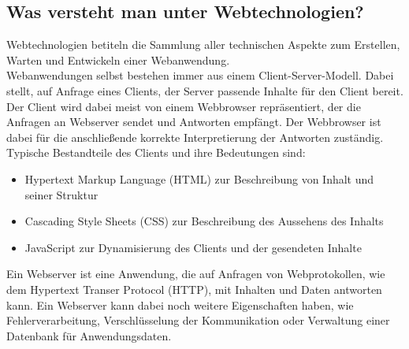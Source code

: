 \subsection{Was versteht man unter Webtechnologien?}
Webtechnologien betiteln die Sammlung aller technischen Aspekte zum Erstellen, Warten und Entwickeln einer Webanwendung.\\
Webanwendungen selbst bestehen immer aus einem Client-Server-Modell. Dabei stellt, auf Anfrage eines Clients, der Server passende Inhalte für den Client bereit. Der Client wird dabei meist von einem Webbrowser repräsentiert, der die Anfragen an Webserver sendet und Antworten empfängt. Der Webbrowser ist dabei für die anschließende korrekte Interpretierung der Antworten zuständig.
Typische Bestandteile des Clients und ihre Bedeutungen sind: 
\begin{itemize}
	\item Hypertext Markup Language (HTML) zur Beschreibung von Inhalt und seiner Struktur
	\item Cascading Style Sheets (CSS) zur Beschreibung des Aussehens des Inhalts
	\item JavaScript zur Dynamisierung des Clients und der gesendeten Inhalte
\end{itemize}
Ein Webserver ist eine Anwendung, die auf Anfragen von Webprotokollen, wie dem Hypertext Transer Protocol (HTTP), mit Inhalten und Daten antworten kann. Ein Webserver kann dabei noch weitere Eigenschaften haben, wie Fehlerverarbeitung, Verschlüsselung der Kommunikation oder Verwaltung einer Datenbank für Anwendungsdaten.

